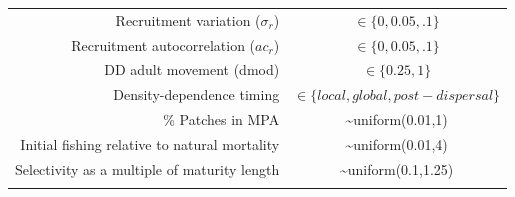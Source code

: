 \documentclass[]{article}
\begin{document}
\begin{longtable}[]{@{}rc@{}}
\begin{minipage}[t]{0.41\columnwidth}
Recruitment variation (\(\sigma_{r}\))\strut
\end{minipage} & \begin{minipage}[t]{0.53\columnwidth}\centering
\(\in\{0,0.05,.1\}\)\strut
\end{minipage}\tabularnewline
\begin{minipage}[t]{0.41\columnwidth}\raggedleft
Recruitment autocorrelation (\(ac_{r}\))\strut
\end{minipage} & \begin{minipage}[t]{0.53\columnwidth}\centering
\(\in\{0,0.05,.1\}\)\strut
\end{minipage}\tabularnewline
\begin{minipage}[t]{0.41\columnwidth}\raggedleft
DD adult movement (dmod)\strut
\end{minipage} & \begin{minipage}[t]{0.53\columnwidth}\centering
\(\in\{0.25,1\}\)\strut
\end{minipage}\tabularnewline
\begin{minipage}[t]{0.41\columnwidth}\raggedleft
Density-dependence timing\strut
\end{minipage} & \begin{minipage}[t]{0.53\columnwidth}\centering
\(\in\{local, global,post-dispersal\}\)\strut
\end{minipage}\tabularnewline
\begin{minipage}[t]{0.41\columnwidth}\raggedleft
\% Patches in MPA\strut
\end{minipage} & \begin{minipage}[t]{0.53\columnwidth}\centering
\textasciitilde uniform(0.01,1)\strut
\end{minipage}\tabularnewline
\begin{minipage}[t]{0.41\columnwidth}\raggedleft
Initial fishing relative to natural mortality\strut
\end{minipage} & \begin{minipage}[t]{0.53\columnwidth}\centering
\textasciitilde uniform(0.01,4)\strut
\end{minipage}\tabularnewline
\begin{minipage}[t]{0.41\columnwidth}\raggedleft
Selectivity as a multiple of maturity length\strut
\end{minipage} & \begin{minipage}[t]{0.53\columnwidth}\centering
\textasciitilde uniform(0.1,1.25)\strut
\end{minipage}\tabularnewline
\begin{minipage}[t]{0.41\columnwidth}\raggedleft

\end{minipage}
\end{longtable}
\end{document}
